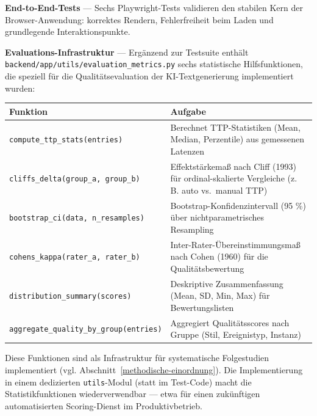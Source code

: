 \textbf{End-to-End-Tests} --- Sechs Playwright-Tests validieren den
stabilen Kern der Browser-Anwendung: korrektes Rendern, Fehlerfreiheit
beim Laden und grundlegende Interaktionspunkte.

\textbf{Evaluations-Infrastruktur} --- Ergänzend zur Testsuite enthält
\texttt{backend/app/utils/evaluation\_metrics.py} sechs statistische
Hilfsfunktionen, die speziell für die Qualitätsevaluation der
KI-Textgenerierung implementiert wurden:

{\def\LTcaptype{none} %
\begin{longtable}[]{@{}
  >{\raggedright\arraybackslash}p{}
  >{\raggedright\arraybackslash}p{}@{}}
\toprule\noalign{}
\begin{minipage}[b]{\linewidth}\raggedright
Funktion
\end{minipage} & \begin{minipage}[b]{\linewidth}\raggedright
Aufgabe
\end{minipage} \\
\midrule\noalign{}
\endhead
\bottomrule\noalign{}
\endlastfoot
\texttt{compute\_ttp\_stats(entries)} & Berechnet TTP-Statistiken (Mean,
Median, Perzentile) aus gemessenen Latenzen \\
\texttt{cliffs\_delta(group\_a,\ group\_b)} & Effektstärkemaß nach Cliff
(1993) für ordinal-skalierte Vergleiche (z. B. auto vs.~manual TTP) \\
\texttt{bootstrap\_ci(data,\ n\_resamples)} &
Bootstrap-Konfidenzintervall (95 \%) über nichtparametrisches
Resampling \\
\texttt{cohens\_kappa(rater\_a,\ rater\_b)} &
Inter-Rater-Übereinstimmungsmaß nach Cohen (1960) für die
Qualitätsbewertung \\
\texttt{distribution\_summary(scores)} & Deskriptive Zusammenfassung
(Mean, SD, Min, Max) für Bewertungslisten \\
\texttt{aggregate\_quality\_by\_group(entries)} & Aggregiert
Qualitätsscores nach Gruppe (Stil, Ereignistyp, Instanz) \\
\end{longtable}
}

Diese Funktionen sind als Infrastruktur für systematische Folgestudien
implementiert (vgl. Abschnitt~\ref{methodische-einordnung}). Die
Implementierung in einem dedizierten \texttt{utils}-Modul (statt im
Test-Code) macht die Statistikfunktionen wiederverwendbar --- etwa für
einen zukünftigen automatisierten Scoring-Dienst im Produktivbetrieb.

